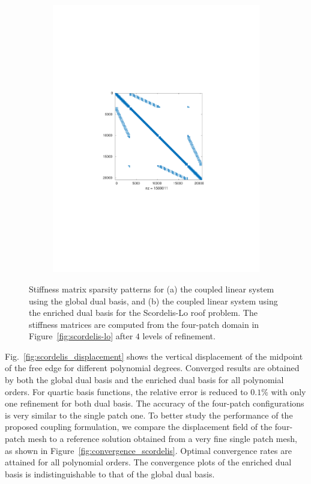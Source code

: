 \begin{figure}[h]
\begin{subfigure}[b]{.48\textwidth}
		\includegraphics[clip, trim=5cm 8.5cm 5cm 9cm, width = .9\textwidth]{enriched_sparsity}
		\caption{}
	\end{subfigure}
	\caption{Stiffness matrix sparsity patterns for (a) the coupled linear system using the global dual basis, and (b) the coupled linear system using the enriched \Bezier dual basis for the Scordelis-Lo roof problem. The stiffness matrices are computed from the four-patch domain in Figure~\ref{fig:scordelis-lo} after $4$ levels of refinement.}\label{fig:scordelis-lo-sparsity}
\end{figure}

Fig.~\ref{fig:scordelis_displacement} shows the vertical displacement of the midpoint of the free edge for different polynomial degrees. Converged results are obtained by both the global dual basis and the enriched \Bezier dual basis for all polynomial orders. For quartic basis functions, the relative error is reduced to $0.1\%$ with only one refinement for both dual basis. The accuracy of the four-patch configurations is very similar to the single patch one. To better study the performance of the proposed coupling formulation, we compare the displacement field of the four-patch mesh to a reference solution obtained from a very fine single patch mesh, as shown in Figure~\ref{fig:convergence_scordelis}. Optimal convergence rates are attained for all polynomial orders. The convergence plots of the enriched \Bezier dual basis is indistinguishable to that of the global dual basis.

